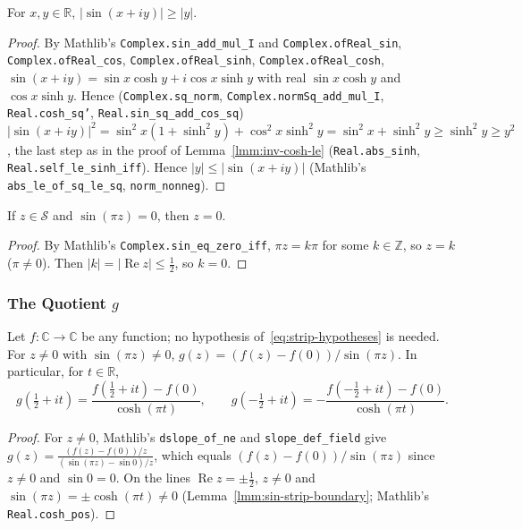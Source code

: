 \begin{lemma}
    \label{lmm:sin-norm-lower-bound}
    \leanok
    For $x, y \in \mathbb{R}$, $|\sin(x + iy)| \ge |y|$.
\end{lemma}
\begin{proof}
    \leanok
    By Mathlib's \texttt{Complex.sin\_add\_mul\_I} and \texttt{Complex.ofReal\_sin}, \texttt{Complex.ofReal\_cos}, \texttt{Complex.ofReal\_sinh}, \texttt{Complex.ofReal\_cosh}, $\sin(x + iy) = \sin x \cosh y + i\cos x \sinh y$ with real $\sin x \cosh y$ and $\cos x \sinh y$. Hence (\texttt{Complex.sq\_norm}, \texttt{Complex.normSq\_add\_mul\_I}, \texttt{Real.cosh\_sq'}, \texttt{Real.sin\_sq\_add\_cos\_sq}) $|\sin(x + iy)|^2 = \sin^2 x(1 + \sinh^2 y) + \cos^2 x \sinh^2 y = \sin^2 x + \sinh^2 y \ge \sinh^2 y \ge y^2$, the last step as in the proof of Lemma~\ref{lmm:inv-cosh-le} (\texttt{Real.abs\_sinh}, \texttt{Real.self\_le\_sinh\_iff}). Hence $|y| \le |\sin(x + iy)|$ (Mathlib's \texttt{abs\_le\_of\_sq\_le\_sq}, \texttt{norm\_nonneg}).
\end{proof}

\begin{lemma}
    \label{lmm:sin-pi-zero-strip}
    \leanok
    If $z \in \mathcal{S}$ and $\sin(\pi z) = 0$, then $z = 0$.
\end{lemma}
\begin{proof}
    \leanok
    By Mathlib's \texttt{Complex.sin\_eq\_zero\_iff}, $\pi z = k\pi$ for some $k \in \mathbb{Z}$, so $z = k$ ($\pi \ne 0$). Then $|k| = |\operatorname{Re} z| \le \tfrac{1}{2}$, so $k = 0$.
\end{proof}

\subsubsection{The Quotient $g$}

\begin{lemma}
    \label{lmm:strip-quotient-formula}
    \leanok
    Let $f : \mathbb{C} \to \mathbb{C}$ be any function; no hypothesis of~\eqref{eq:strip-hypotheses} is needed. For $z \ne 0$ with $\sin(\pi z) \ne 0$, $g(z) = (f(z) - f(0))/\sin(\pi z)$. In particular, for $t \in \mathbb{R}$,
    \[ g(\tfrac{1}{2} + it) = \frac{f(\tfrac{1}{2} + it) - f(0)}{\cosh(\pi t)}, \qquad g(-\tfrac{1}{2} + it) = -\frac{f(-\tfrac{1}{2} + it) - f(0)}{\cosh(\pi t)}. \]
\end{lemma}
\begin{proof}
    \leanok
    For $z \ne 0$, Mathlib's \texttt{dslope\_of\_ne} and \texttt{slope\_def\_field} give $g(z) = \frac{(f(z) - f(0))/z}{(\sin(\pi z) - \sin 0)/z}$, which equals $(f(z) - f(0))/\sin(\pi z)$ since $z \ne 0$ and $\sin 0 = 0$. On the lines $\operatorname{Re} z = \pm\tfrac{1}{2}$, $z \ne 0$ and $\sin(\pi z) = \pm\cosh(\pi t) \ne 0$ (Lemma~\ref{lmm:sin-strip-boundary}; Mathlib's \texttt{Real.cosh\_pos}).
\end{proof}


